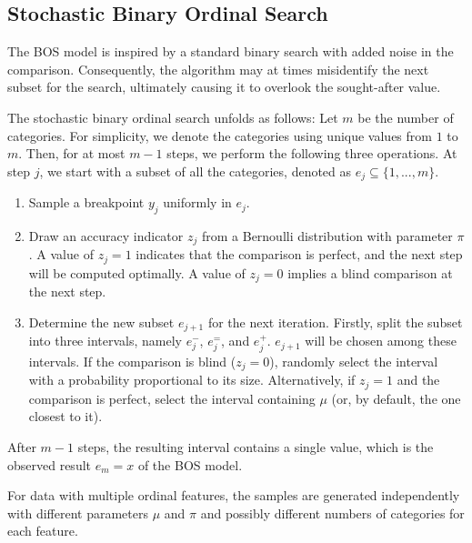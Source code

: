 
\subsection{Stochastic Binary Ordinal Search} 

The BOS model is inspired by a standard binary search with added noise in the comparison. Consequently, the algorithm may at times misidentify the next subset for the search, ultimately causing it to overlook the sought-after value.

The stochastic binary ordinal search unfolds as follows: Let $m$ be the number of categories. For simplicity, we denote the categories using unique values from $1$ to $m$. Then, for at most $m-1$ steps, we perform the following three operations. At step $j$, we start with a subset of all the categories, denoted as $e_j\subseteq \{1,...,m\}$.

\begin{enumerate}
    \item Sample a breakpoint $y_j$ uniformly in $e_j$.
    \item Draw an accuracy indicator $z_j$ from a Bernoulli distribution with parameter $\pi$. A value of $z_j=1$ indicates that the comparison is perfect, and the next step will be computed optimally. A value of $z_j=0$ implies a blind comparison at the next step.
    \item Determine the new subset $e_{j+1}$ for the next iteration. Firstly, split the subset into three intervals, namely $e_j^-$, $e_j^=$, and $e_j^+$. $e_{j+1}$ will be chosen among these intervals. If the comparison is blind ($z_j=0$), randomly select the interval with a probability proportional to its size. Alternatively, if $z_j=1$ and the comparison is perfect, select the interval containing $\mu$ (or, by default, the one closest to it).
\end{enumerate}
After $m-1$ steps, the resulting interval contains a single value, which is the observed result $e_m={x}$ of the BOS model.

For data with multiple ordinal features, the samples are generated independently with different parameters $\mu$ and $\pi$ and possibly different numbers of categories for each feature.


